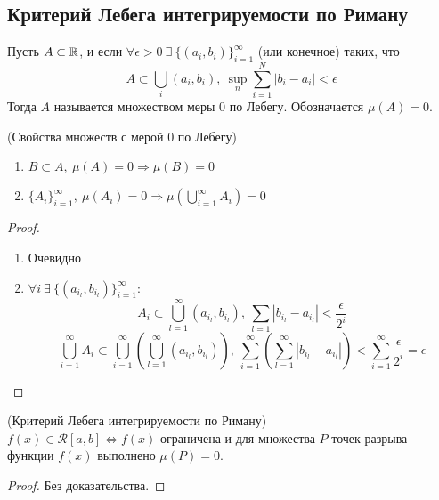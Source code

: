 \subsection{Критерий Лебега интегрируемости по Риману}
\begin{definition}
    Пусть $A\subset \mathbb{R}$, и если $\forall \epsilon>0\ \exists\ \{(a_i,b_i)\}_{i=1}^{\infty}$ (или конечное) таких, что 
    \[A\subset \bigcup\limits_i(a_i,b_i),\ \sup\limits_n \sum\limits_{i=1}^{N}|b_i-a_i|< \epsilon\]
    Тогда $A$ называется множеством меры 0 по Лебегу. Обозначается $\mu(A)=0$.
\end{definition} 
\begin{theorem} (Свойства множеств с мерой 0 по Лебегу)
    \begin{enumerate}
        \item $B\subset A,\ \mu(A)=0 \Rightarrow \mu(B)=0$
        \item $\{A_i\}_{i=1}^{\infty},\ \mu(A_i)=0 \Rightarrow \mu(\bigcup\limits_{i=1}^{\infty} A_i)=0$
    \end{enumerate}
\end{theorem} 
\begin{proof} \
    \begin{enumerate}
        \item Очевидно
        \item $\forall i\ \exists\ \{(a_{i_l},b_{i_l})\}_{i=1}^{\infty}:$
        \[A_i\subset \bigcup\limits_{l=1}^{\infty} (a_{i_l},b_{i_l}),\ \sum\limits_{l=1} |b_{i_l}-a_{i_l}|<\frac{\epsilon}{2^i}\]
        \[\bigcup\limits_{i=1}^{\infty} A_i \subset \bigcup\limits_{i=1}^{\infty}\left(\bigcup\limits_{l=1}^{\infty} (a_{i_l},b_{i_l})\right),\ \sum\limits_{i=1}^{\infty}\left(\sum\limits_{l=1}^{\infty} |b_{i_l}-a_{i_l}|\right)<\sum\limits_{i=1}^{\infty}\frac{\epsilon}{2^i}=\epsilon\]
    \end{enumerate}
\end{proof} 
\begin{theorem} (Критерий Лебега интегрируемости по Риману)\\
    $f(x)\in \mathcal{R}[a,b] \Leftrightarrow f(x)$ ограничена и для множества $P$ точек разрыва функции $f(x)$ выполнено $\mu(P)=0$.
\end{theorem} 
\begin{proof}
    Без доказательства.
\end{proof} 
